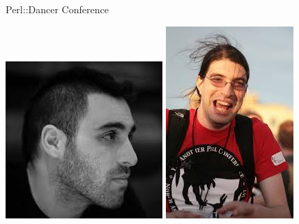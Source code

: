 \begin{frame}[plain]{Perl::Dancer Conference}
\begin{center}
  \includegraphics[width=\textwidth,height=1\textheight,keepaspectratio]{images/sawyer.jpg}
 \includegraphics[width=\textwidth,height=1\textheight,keepaspectratio]{images/ribasushi.jpg}

\end{center}
\end{frame}
